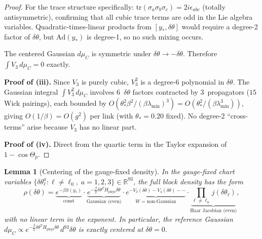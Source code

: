 \documentclass[11pt]{article}
\newtheorem{lemma}[theorem]{Lemma}
\theoremstyle{definition}
\newcommand{\tr}{\mathrm{tr}}
\newcommand{\R}{\mathbb{R}}
\begin{document}
\begin{proof}
For the trace structure specifically:
$\tr(\sigma_a\sigma_b\sigma_c)=2i\epsilon_{abc}$
(totally antisymmetric), confirming that all cubic trace
terms are odd in the Lie algebra variables.
Quadratic-times-linear products from $[y_*,\delta\theta]$
would require a degree-2 factor of $\delta\theta$, but
$\mathrm{Ad}(y_*)$ is degree-1, so no such mixing occurs.

The centered Gaussian
$d\mu_C$ is symmetric under $\delta\theta\to-\delta\theta$.
Therefore $\int V_3\,d\mu_C=0$ exactly.

\textbf{Proof of (iii).}
Since $V_3$ is purely cubic, $V_3^2$ is a degree-6 polynomial in
$\delta\theta$.  The Gaussian integral
$\int V_3^2\,d\mu_C$ involves 6~$\delta\theta$ factors contracted by
3~propagators ($15$ Wick pairings), each bounded by
$O(\theta_*^2\beta^2/(\beta\lambda_{\min})^3)
=O(\theta_*^2/(\beta\lambda_{\min}^3))$, giving
$O(1/\beta)=O(g^2)$ per link (with $\theta_*=0.20$ fixed).
No degree-2 ``cross-terms'' arise because $V_3$ has no linear part.

\textbf{Proof of (iv).} Direct from the quartic term in the Taylor
expansion of $1-\cos\Theta_p$.
\end{proof}

\begin{lemma}[Centering of the gauge-fixed density]%
\label{lem:centering}
In the gauge-fixed chart variables
$\{\delta\theta_\ell^a:\ell\ne\ell_0,\;a=1,2,3\}\in\R^{93}$,
the full block density has the form
\begin{equation}\label{eq:full-density}
\rho(\delta\theta)
=\underbrace{e^{-\beta S(y_*)}}_{\text{const}}
\cdot
\underbrace{e^{-\frac{\beta}{2}\delta\theta^T H_{\mathrm{phys}}
\delta\theta}}_{\text{Gaussian (even)}}
\cdot
\underbrace{e^{-V_3(\delta\theta)-V_4(\delta\theta)-\cdots}}_
{W=\text{non-Gaussian}}
\cdot
\underbrace{\prod_{\ell\ne\ell_0}j(\delta\theta_\ell)}_
{\text{Haar Jacobian (even)}},
\end{equation}
with \emph{no linear term in the exponent}.  In particular,
the reference Gaussian $d\mu_C\propto
e^{-\frac{\beta}{2}\delta\theta^T H_{\mathrm{phys}}\delta\theta}
\,d^{93}\delta\theta$ is exactly centered at $\delta\theta=0$.
\end{lemma}
\end{document}
